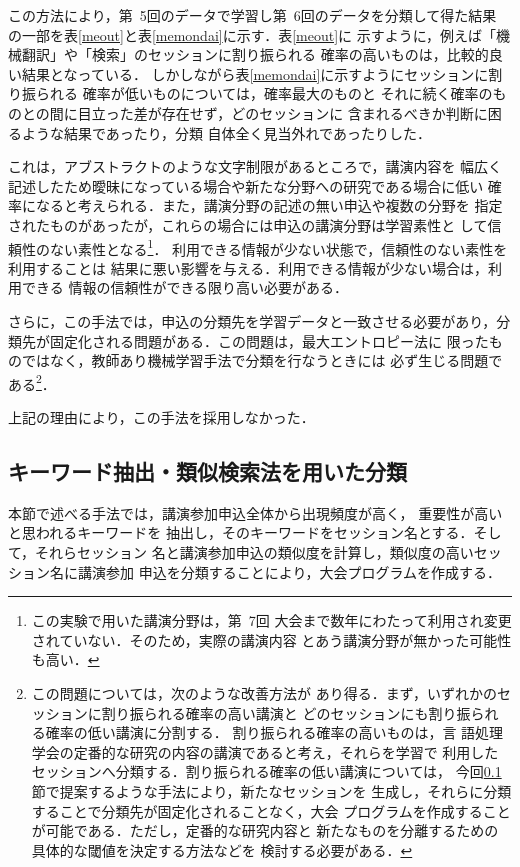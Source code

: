 この方法により，第\ 5回のデータで学習し第\ 6回のデータを分類して得た結果
の一部を表\ref{meout}と表\ref{memondai}に示す．表\ref{meout}に
示すように，例えば「機械翻訳」や「検索」のセッションに割り振られる
確率の高いものは，比較的良い結果となっている．
しかしながら表\ref{memondai}に示すようにセッションに割り振られる
確率が低いものについては，確率最大のものと
それに続く確率のものとの間に目立った差が存在せず，どのセッションに
含まれるべきか判断に困るような結果であったり，分類
自体全く見当外れであったりした．

これは，アブストラクトのような文字制限があるところで，講演内容を
幅広く記述したため曖昧になっている場合や新たな分野への研究である場合に低い
確率になると考えられる．また，講演分野の記述の無い申込や複数の分野を
指定されたものがあったが，これらの場合には申込の講演分野は学習素性と
して信頼性のない素性となる\footnote{この実験で用いた講演分野は，第\ 7回
大会まで数年にわたって利用され変更されていない．そのため，実際の講演内容
とあう講演分野が無かった可能性も高い．}．
利用できる情報が少ない状態で，信頼性のない素性を利用することは
結果に悪い影響を与える．利用できる情報が少ない場合は，利用できる
情報の信頼性ができる限り高い必要がある．

さらに，この手法では，申込の分類先を学習データと一致させる必要があり，分
類先が固定化される問題がある．この問題は，最大エントロピー法に
限ったものではなく，教師あり機械学習手法で分類を行なうときには
必ず生じる問題である\footnote{この問題については，次のような改善方法が
あり得る．まず，いずれかのセッションに割り振られる確率の高い講演と
どのセッションにも割り振られる確率の低い講演に分割する．
割り振られる確率の高いものは，言
語処理学会の定番的な研究の内容の講演であると考え，それらを学習で
利用したセッションへ分類する．割り振られる確率の低い講演については，
今回\ref{hoho}節で提案するような手法により，新たなセッションを
生成し，それらに分類することで分類先が固定化されることなく，大会
プログラムを作成することが可能である．ただし，定番的な研究内容と
新たなものを分離するための具体的な閾値を決定する方法などを
検討する必要がある．}．

上記の理由により，この手法を採用しなかった．

\subsection{キーワード抽出・類似検索法を用いた分類}
\label{hoho}
本節で述べる手法では，講演参加申込全体から出現頻度が高く，
重要性が高いと思われるキーワードを
抽出し，そのキーワードをセッション名とする．そして，それらセッション
名と講演参加申込の類似度を計算し，類似度の高いセッション名に講演参加
申込を分類することにより，大会プログラムを作成する．

